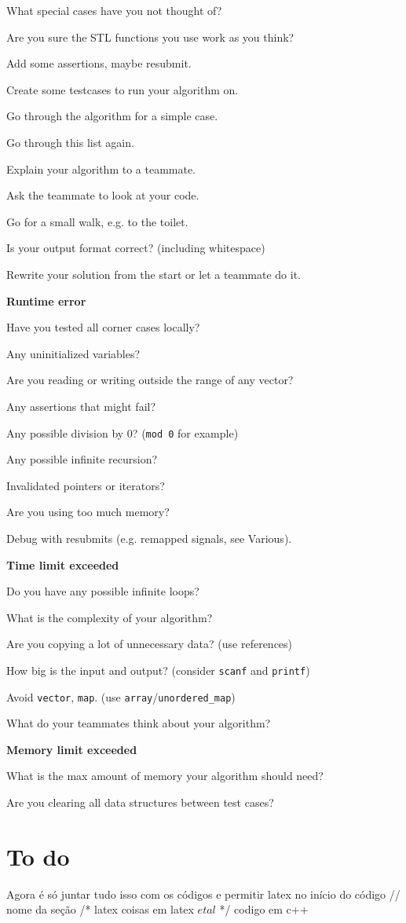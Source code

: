\documentclass[a4paper]{article}
\begin{document}
\noindent
What special cases have you not thought of?

\noindent
Are you sure the STL functions you use work as you think?

\noindent
Add some assertions, maybe resubmit.

\noindent
Create some testcases to run your algorithm on.

\noindent
Go through the algorithm for a simple case.

\noindent
Go through this list again.

\noindent
Explain your algorithm to a teammate.

\noindent
Ask the teammate to look at your code.

\noindent
Go for a small walk, e.g. to the toilet.

\noindent
Is your output format correct? (including whitespace)

\noindent
Rewrite your solution from the start or let a teammate do it.

\noindent
\textbf{Runtime error}

\noindent
Have you tested all corner cases locally?

\noindent
Any uninitialized variables?

\noindent
Are you reading or writing outside the range of any vector?

\noindent
Any assertions that might fail?

\noindent
Any possible division by 0? (\texttt{mod 0} for example)

\noindent
Any possible infinite recursion?

\noindent
Invalidated pointers or iterators?

\noindent
Are you using too much memory?

\noindent
Debug with resubmits (e.g. remapped signals, see Various).

\noindent
\textbf{Time limit exceeded}

\noindent
Do you have any possible infinite loops?

\noindent
What is the complexity of your algorithm?

\noindent
Are you copying a lot of unnecessary data? (use references)

\noindent
How big is the input and output? (consider \texttt{scanf} and \texttt{printf})

\noindent
Avoid \texttt{vector}, \texttt{map}. (use \texttt{array}/\texttt{unordered\_map})

\noindent
What do your teammates think about your algorithm?

\noindent
\textbf{Memory limit exceeded}

\noindent
What is the max amount of memory your algorithm should need?

\noindent
Are you clearing all data structures between test cases?

\section{To do}
Agora é só juntar tudo isso com os códigos e permitir latex no início do código
// nome da seção
/* latex
coisas em latex $e tal$
*/
codigo em c++
\end{document}
